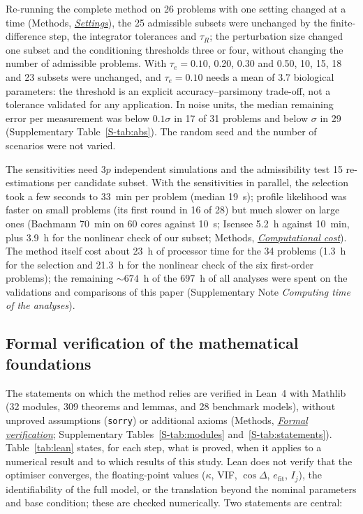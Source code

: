 \documentclass[pdflatex,sn-nature]{sn-jnl}
\theoremstyle{plain}
\newcommand{\mref}[2]{\hyperref[#1]{#2}}
\begin{document}
Re-running the complete method on 26 problems with one setting changed at a time (Methods, \mref{met:settings}{\emph{Settings}}), the 25 admissible subsets were unchanged by the finite-difference step, the integrator tolerances and $\tau_R$; the perturbation size changed one subset and the conditioning thresholds three or four, without changing the number of admissible problems. With $\tau_e=0.10$, 0.20, 0.30 and 0.50, 10, 15, 18 and 23 subsets were unchanged, and $\tau_e=0.10$ needs a mean of 3.7 biological parameters: the threshold is an explicit accuracy--parsimony trade-off, not a tolerance validated for any application. In noise units, the median remaining error per measurement was below $0.1\sigma$ in 17 of 31 problems and below $\sigma$ in 29 (Supplementary Table~\ref{S-tab:abs}). The random seed and the number of scenarios were not varied.

The sensitivities need $3p$ independent simulations and the admissibility test 15 re-estimations per candidate subset. With the sensitivities in parallel, the selection took a few seconds to 33~min per problem (median 19~s); profile likelihood was faster on small problems (its first round in 16 of 28) but much slower on large ones (Bachmann 70~min on 60 cores against 10~s; Isensee 5.2~h against 10~min, plus 3.9~h for the nonlinear check of our subset; Methods, \mref{met:cost}{\emph{Computational cost}}). The method itself cost about 23~h of processor time for the 34 problems (1.3~h for the selection and 21.3~h for the nonlinear check of the six first-order problems); the remaining ${\sim}674$~h of the 697~h of all analyses were spent on the validations and comparisons of this paper (Supplementary Note \textit{Computing time of the analyses}).

\subsection*{Formal verification of the mathematical foundations}\label{sec:formal}

The statements on which the method relies are verified in Lean~4 with Mathlib (32 modules, 309 theorems and lemmas, and 28 benchmark models), without unproved assumptions (\texttt{sorry}) or additional axioms (Methods, \mref{met:formal}{\emph{Formal verification}}; Supplementary Tables~\ref{S-tab:modules} and~\ref{S-tab:statements}). Table~\ref{tab:lean} states, for each step, what is proved, when it applies to a numerical result and to which results of this study. Lean does not verify that the optimiser converges, the floating-point values ($\kappa$, VIF, $\cos\Delta$, $e_{\mathrm{fit}}$, $I_j$), the identifiability of the full model, or the translation beyond the nominal parameters and base condition; these are checked numerically. Two statements are central:
\end{document}
